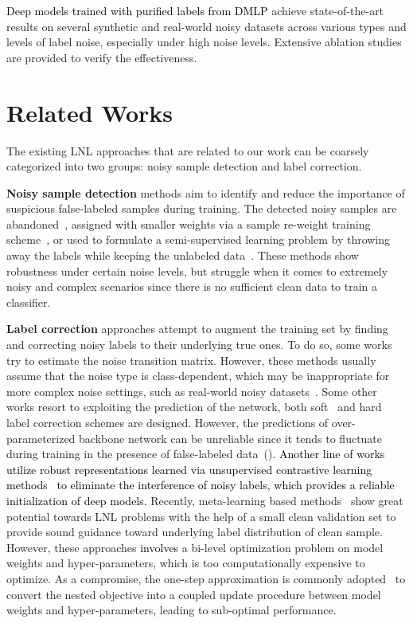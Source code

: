 \documentclass[10pt,twocolumn,letterpaper]{article}
\newcommand{\zbs}[1]{\textcolor{black}{#1}}
\newcommand{\lyx}[1]{\textcolor{black}{#1}}
\newcommand{\zbsN}[1]{\textcolor{black}{#1}}
\begin{document}
 \lyx{Deep models trained with purified labels from DMLP} achieve state-of-the-art results on several synthetic and real-world noisy datasets across various types and levels of label noise, especially under high noise levels. Extensive ablation studies are provided to verify the effectiveness.




\section{Related Works}
The existing LNL approaches that are related to our work can be coarsely categorized into two groups: noisy sample detection and label correction.  

\textbf{Noisy sample detection} methods aim to identify and reduce the importance of suspicious false-labeled samples during training. The detected noisy samples are abandoned~\cite{Co-han2018co,aumranking2020}, assigned with smaller weights via a sample re-weight training scheme~\cite{importance-reweight-pami2015}, or used to formulate a semi-supervised learning problem by throwing away the labels while keeping the unlabeled data~\cite{li2020dividemix,zhang2020decoupling}. These methods show robustness under certain noise levels, but struggle when it comes to extremely noisy and complex scenarios since there is no sufficient clean data to train a classifier. 

\textbf{Label correction} approaches attempt to augment the training set by finding and correcting noisy labels to their underlying true ones. To do so, some works~\cite{patrini2017making} try to estimate the noise transition matrix. However, these methods usually assume that the noise type is class-dependent, which may be inappropriate for more complex noise settings, such as real-world noisy datasets~\cite{Clothing1M}.
Some other works resort to exploiting the prediction of the network, both soft~\cite{Reed2015Training,han2019deep,yi2019probabilistic,arazo2019unsupervised} and hard~\cite{tanaka2018joint,song2019selfie} label correction schemes are designed. However, the predictions of over-parameterized backbone network can be unreliable since it tends to fluctuate during training in the presence of false-labeled data~(\cite{zhang2020decoupling}). 
\zbsN{Another line of works utilize robust representations learned via unsupervised contrastive learning methods~\cite{zhang2020decoupling,li2021learning,ghosh2021contrastive,zheltonozhskii2022contrast} to eliminate the interference of noisy labels, which provides a reliable initialization of deep models.}
Recently, meta-learning based methods~\cite{Learning-to-Reweight,MLNT,AAAI-2021-meta,zheng2021meta} show great potential towards LNL problems with the help of a small clean validation set to provide sound guidance toward underlying label distribution of clean sample. However, these approaches \zbs{involves} a bi-level optimization problem on model weights and hyper-parameters, which is too computationally expensive to optimize. As a compromise, the one-step approximation is commonly adopted~\cite{AAAI-2021-meta,zheng2021meta} to convert the nested objective into a coupled update procedure between model weights and hyper-parameters, leading to sub-optimal performance.
\end{document}
